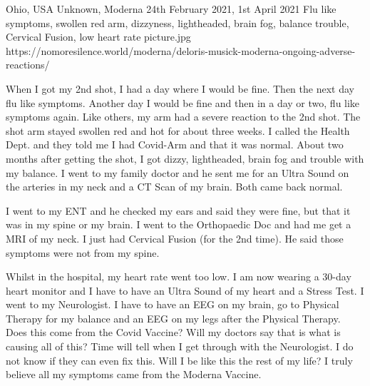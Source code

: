           {Ohio, USA}
          {Unknown,}
          {Moderna}
          {24th February 2021, 1st April 2021}
          {Flu like symptoms, swollen red arm, dizzyness, lightheaded, brain fog, balance trouble, Cervical Fusion, low heart rate}
          {picture.jpg}
          {https://nomoresilence.world/moderna/deloris-musick-moderna-ongoing-adverse-reactions/}
          {

When I got my 2nd shot, I had a day where I would be fine. Then the next day flu
like symptoms. Another day I would be fine and then in a day or two, flu like
symptoms again. Like others, my arm had a severe reaction to the 2nd shot. The
shot arm stayed swollen red and hot for about three weeks. I called the Health
Dept. and they told me I had Covid-Arm and that it was normal. About two months
after getting the shot, I got dizzy, lightheaded, brain fog and trouble with my
balance. I went to my family doctor and he sent me for an Ultra Sound on the
arteries in my neck and a CT Scan of my brain. Both came back normal.

I went to my ENT and he checked my ears and said they were fine, but that it was
in my spine or my brain. I went to the Orthopaedic Doc and had me get a MRI of
my neck. I just had Cervical Fusion (for the 2nd time). He said those symptoms
were not from my spine.

Whilst in the hospital, my heart rate went too low. I am now wearing a 30-day
heart monitor and I have to have an Ultra Sound of my heart and a Stress Test. I
went to my Neurologist. I have to have an EEG on my brain, go to Physical
Therapy for my balance and an EEG on my legs after the Physical Therapy. Does
this come from the Covid Vaccine? Will my doctors say that is what is causing
all of this? Time will tell when I get through with the Neurologist. I do not
know if they can even fix this. Will I be like this the rest of my life? I truly
believe all my symptoms came from the Moderna Vaccine.

}

